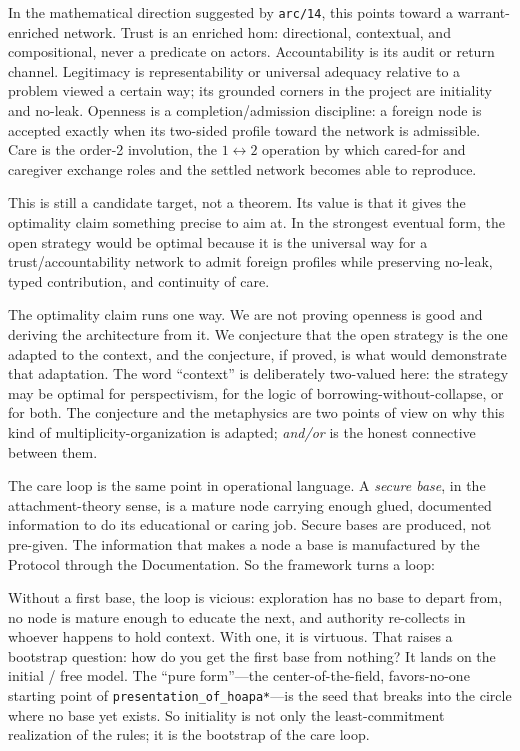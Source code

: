 \documentclass[11pt]{article}
\begin{document}
In the mathematical direction suggested by \texttt{arc/14}, this points toward
a warrant-enriched network. Trust is an enriched hom: directional, contextual,
and compositional, never a predicate on actors. Accountability is its audit or
return channel. Legitimacy is representability or universal adequacy relative
to a problem viewed a certain way; its grounded corners in the project are
initiality and no-leak. Openness is a completion/admission discipline: a
foreign node is accepted exactly when its two-sided profile toward the network
is admissible. Care is the order-2 involution, the \(1 \leftrightarrow 2\)
operation by which cared-for and caregiver exchange roles and the settled
network becomes able to reproduce.

This is still a candidate target, not a theorem. Its value is that it gives the
optimality claim something precise to aim at. In the strongest eventual form,
the open strategy would be optimal because it is the universal way for a
trust/accountability network to admit foreign profiles while preserving
no-leak, typed contribution, and continuity of care.

The optimality claim runs one way. We are not proving openness is good and
deriving the architecture from it. We conjecture that the open strategy is the
one adapted to the context, and the conjecture, if proved, is what would
demonstrate that adaptation. The word ``context'' is deliberately two-valued
here: the strategy may be optimal for perspectivism, for the logic of
borrowing-without-collapse, or for both. The conjecture and the metaphysics are
two points of view on why this kind of multiplicity-organization is adapted;
\emph{and/or} is the honest connective between them.

The care loop is the same point in operational language. A \emph{secure base},
in the attachment-theory sense, is a mature node carrying enough glued,
documented information to do its educational or caring job. Secure bases are
produced, not pre-given. The information that makes a node a base is
manufactured by the Protocol through the Documentation. So the framework turns
a loop:

\begin{center}
\end{center}

Without a first base, the loop is vicious: exploration has no base to depart
from, no node is mature enough to educate the next, and authority re-collects
in whoever happens to hold context. With one, it is virtuous. That raises a
bootstrap question: how do you get the first base from nothing? It lands on the
initial / free model. The ``pure form''---the center-of-the-field,
favors-no-one starting point of \texttt{presentation\_of\_hoapa*}---is the
seed that breaks into the circle where no base yet exists. So initiality is not
only the least-commitment realization of the rules; it is the bootstrap of the
care loop.
\end{document}
